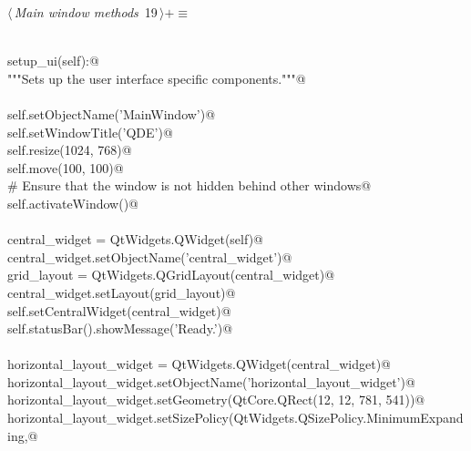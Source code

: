\documentclass[
    a4paper,      %
    10pt,         %
    openright,    %
    notitlepage,  %
    parskip=half, %
]{scrreprt}       %
\theoremstyle{definition}                    %
\begin{document}
\begin{flushleft} \small
\begin{minipage}{\linewidth}\label{scrap9}\raggedright\small
{} $\langle\,${\itshape Main window methods}\nobreak\ {\footnotesize {19}}$\,\rangle+\equiv$
\vspace{-1ex}
\begin{list}{}{} \item
\mbox{}\lstinline@@\\
\mbox{}\lstinline@def setup_ui(self):@\\
\mbox{}\lstinline@    """Sets up the user interface specific components."""@\\
\mbox{}\lstinline@@\\
\mbox{}\lstinline@    self.setObjectName('MainWindow')@\\
\mbox{}\lstinline@    self.setWindowTitle('QDE')@\\
\mbox{}\lstinline@    self.resize(1024, 768)@\\
\mbox{}\lstinline@    self.move(100, 100)@\\
\mbox{}\lstinline@    # Ensure that the window is not hidden behind other windows@\\
\mbox{}\lstinline@    self.activateWindow()@\\
\mbox{}\lstinline@@\\
\mbox{}\lstinline@    central_widget = QtWidgets.QWidget(self)@\\
\mbox{}\lstinline@    central_widget.setObjectName('central_widget')@\\
\mbox{}\lstinline@    grid_layout = QtWidgets.QGridLayout(central_widget)@\\
\mbox{}\lstinline@    central_widget.setLayout(grid_layout)@\\
\mbox{}\lstinline@    self.setCentralWidget(central_widget)@\\
\mbox{}\lstinline@    self.statusBar().showMessage('Ready.')@\\
\mbox{}\lstinline@@\\
\mbox{}\lstinline@    horizontal_layout_widget = QtWidgets.QWidget(central_widget)@\\
\mbox{}\lstinline@    horizontal_layout_widget.setObjectName('horizontal_layout_widget')@\\
\mbox{}\lstinline@    horizontal_layout_widget.setGeometry(QtCore.QRect(12, 12, 781, 541))@\\
\mbox{}\lstinline@    horizontal_layout_widget.setSizePolicy(QtWidgets.QSizePolicy.MinimumExpanding,@\\

\end{list}
\end{minipage}
\end{flushleft}
\end{document}
